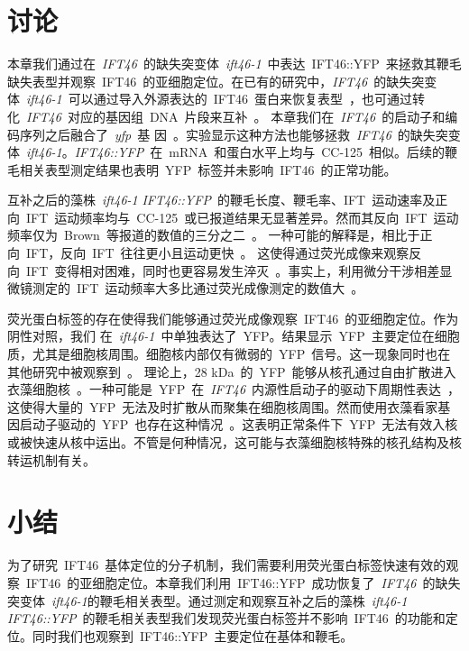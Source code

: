 \section{讨论}
本章我们通过在\ \textit{IFT46}\ 的缺失突变体\ \textit{ift46-1}\ 中表达\ IFT46::YFP\ 来拯救其鞭毛缺失表型并观察\ IFT46\ 的亚细胞定位。在已有的研究中，\textit{IFT46}\ 的缺失突变
体\ \textit{ift46-1}\ 可以通过导入外源表达的\ IFT46\ 蛋白来恢复表型\
\citep{Lucker2010}，也可通过转化\ \textit{IFT46}\ 对应的基因组\ DNA\ 片段来互补\ \citep{Hou2007}。 本章我们在\ \textit{IFT46}\ 的启动子和编码序列之后融合了\ \textit{yfp}\ 基
因\ \citep{Griesbeck2001}。实验显示这种方法也能够拯救\ \textit{IFT46}\ 的缺失突变体\
\textit{ift46-1}。\textit{IFT46::YFP}\ 在\ mRNA\ 和蛋白水平上均与\ CC-125\ 相似。后续的鞭毛相关表型测定结果也表明\ YFP\ 标签并未影响\ IFT46\ 的正常功能。

互补之后的藻株\ \textit{ift46-1} \textit{IFT46::YFP}\ 的鞭毛长度、鞭毛率、IFT\ 运动速率及正向\ IFT\ 运动频率均与\ CC-125\ 或已报道结果无显著差异。然而其反向\ IFT\ 运动频率仅为\ Brown\ 等报道的数值的三分之二\ \citep{Brown2015}。 一种可能的解释是，相比于正向\ IFT，反向\ IFT\ 往往更小且运动更快\
\citep{Lechtreck2013,Lechtreck2016,Pigino2009,Stepanek2016,Vannuccini2016}。 这使得通过荧光成像来观察反向\ IFT\ 变得相对困难，同时也更容易发生淬灭\
\citep{Lechtreck2013,Lechtreck2016,Dentler2009}。事实上，利用微分干涉相差显微镜测定的\ IFT\ 运动频率大多比通过荧光成像测定的数值大\ \citep{Lechtreck2013,Lechtreck2016,Dentler2009}。

荧光蛋白标签的存在使得我们能够通过荧光成像观察\ IFT46\ 的亚细胞定位。作为阴性对照，我们
在\ \textit{ift46-1}\ 中单独表达了\ YFP。结果显示\ YFP\ 主要定位在细胞质，尤其是细胞核周围。细胞核内部仅有微弱的\ YFP\ 信号。这一现象同时也在其他研究中被观察到\ \citep{Lauersen2015,Onishi2016}。 理论上，28 kDa\ 的\ YFP\ 能够从核孔通过自由扩散进入衣藻细胞核\ \citep{Hu2010,Chih2011,Kee2012,Breslow2013}。一种可能是\ YFP\ 在\ \textit{IFT46}\ 内源性启动子的驱动下周期性表达\
\citep{Wood2012}，这使得大量的\ YFP\ 无法及时扩散从而聚集在细胞核周围。然而使用衣藻看家基因启动子驱动的\ YFP\ 也存在这种情况\ \citep{Lauersen2015,Onishi2016}。这表明正常条件下\ YFP\ 无法有效入核或被快速从核中运出。不管是何种情况，这可能与衣藻细胞核特殊的核孔结构及核转运机制有关。

\section{小结}
为了研究\ IFT46\ 基体定位的分子机制，我们需要利用荧光蛋白标签快速有效的观察\ IFT46\ 的亚细胞定位。本章我们利用\ IFT46::YFP\ 成功恢复了\ \textit{IFT46}\ 的缺失突变体\ \textit{ift46-1}的鞭毛相关表型。通过测定和观察互补之后的藻株\ \textit{ift46-1} \textit{IFT46::YFP}\ 的鞭毛相关表型我们发现荧光蛋白标签并不影响\ IFT46\ 的功能和定位。同时我们也观察到\ IFT46::YFP\ 主要定位在基体和鞭毛。 